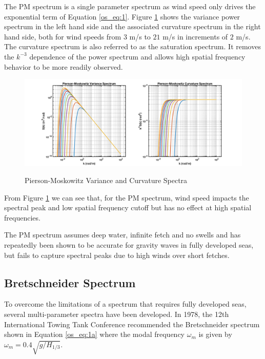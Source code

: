 The PM spectrum is a single parameter spectrum as wind speed only drives the exponential term of Equation \ref{os_eq:1}. Figure \ref{os_fig:1} shows the variance power spectrum in the left hand side and the associated curvature spectrum in the right hand side, both for wind speeds from $3$ m/s to $21$ m/s in increments of $2$ m/s. The curvature spectrum is also referred to as the saturation spectrum. It removes the $k^{-3}$ dependence of the power spectrum and allows high spatial frequency behavior to be more readily observed.
 
 \begin{figure}[H]
  \begin{center}
\includegraphics[width=6in]{../media/Ocean_Surface/PM_variance_curvature_spectrum.png}
  \end{center}
  \renewcommand{\baselinestretch}{1} \small\normalsize
  \begin{quote}
    \caption[Pierson-Moskowitz Variance and Curvature Spectra]{Pierson-Moskowitz Variance and Curvature Spectra\label{os_fig:1}}
  \end{quote}
\end{figure}
 \renewcommand{\baselinestretch}{2} \small\normalsize
 
From Figure \ref{os_fig:1} we can see that, for the PM spectrum, wind speed impacts the spectral peak and low spatial frequency cutoff but has no effect at high spatial frequencies.
 
The PM spectrum assumes deep water, infinite fetch and no swells and has repeatedly been shown to be accurate for gravity waves in fully developed seas, but fails to capture spectral peaks due to high winds over short fetches.

\subsection {Bretschneider Spectrum}
To overcome the limitations of a spectrum that requires fully developed seas, several multi-parameter spectra have been developed. In 1978, the 12th International Towing Tank Conference recommended the Bretschneider spectrum \cite{michel_sea_spectra} shown in Equation \ref{os_eq:1a} where the modal frequency $\omega_m$ is given by $\omega_m = 0.4\sqrt{g/H_{1/3}}$.

